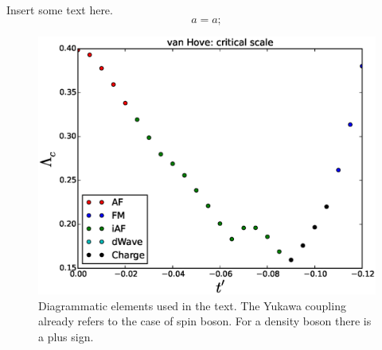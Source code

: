 Insert some text here. 
\begin{equation}
\label{sdmft}
a = a ;  
\end{equation}


\begin{figure}
\includegraphics[scale=0.5]{vanHove_scan_critical_lambda_phi.eps}
\caption{Diagrammatic elements used in the text. The Yukawa coupling already refers to the case of spin boson. For a density boson there is a plus sign. } \label{dictionary}

\end{figure}
